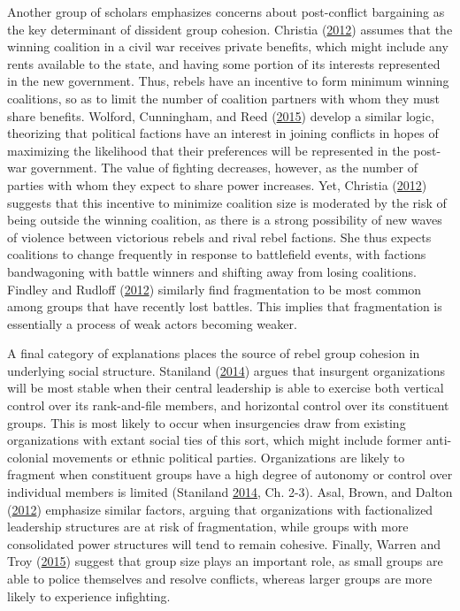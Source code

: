 \documentclass[12pt,]{book}
\theoremstyle{definition}
\theoremstyle{definition}
\theoremstyle{definition}
\theoremstyle{remark}
\begin{document}
Another group of scholars emphasizes concerns about post-conflict
bargaining as the key determinant of dissident group cohesion. Christia
(\protect\hyperlink{ref-Christia2012}{2012}) assumes that the winning
coalition in a civil war receives private benefits, which might include
any rents available to the state, and having some portion of its
interests represented in the new government. Thus, rebels have an
incentive to form minimum winning coalitions, so as to limit the number
of coalition partners with whom they must share benefits. Wolford,
Cunningham, and Reed (\protect\hyperlink{ref-Wolford}{2015}) develop a
similar logic, theorizing that political factions have an interest in
joining conflicts in hopes of maximizing the likelihood that their
preferences will be represented in the post-war government. The value of
fighting decreases, however, as the number of parties with whom they
expect to share power increases. Yet, Christia
(\protect\hyperlink{ref-Christia2012}{2012}) suggests that this
incentive to minimize coalition size is moderated by the risk of being
outside the winning coalition, as there is a strong possibility of new
waves of violence between victorious rebels and rival rebel factions.
She thus expects coalitions to change frequently in response to
battlefield events, with factions bandwagoning with battle winners and
shifting away from losing coalitions. Findley and Rudloff
(\protect\hyperlink{ref-Findley2012}{2012}) similarly find fragmentation
to be most common among groups that have recently lost battles. This
implies that fragmentation is essentially a process of weak actors
becoming weaker.

A final category of explanations places the source of rebel group
cohesion in underlying social structure. Staniland
(\protect\hyperlink{ref-Staniland2014}{2014}) argues that insurgent
organizations will be most stable when their central leadership is able
to exercise both vertical control over its rank-and-file members, and
horizontal control over its constituent groups. This is most likely to
occur when insurgencies draw from existing organizations with extant
social ties of this sort, which might include former anti-colonial
movements or ethnic political parties. Organizations are likely to
fragment when constituent groups have a high degree of autonomy or
control over individual members is limited (Staniland
\protect\hyperlink{ref-Staniland2014}{2014}, Ch. 2-3). Asal, Brown, and
Dalton (\protect\hyperlink{ref-Asal2012}{2012}) emphasize similar
factors, arguing that organizations with factionalized leadership
structures are at risk of fragmentation, while groups with more
consolidated power structures will tend to remain cohesive. Finally,
Warren and Troy (\protect\hyperlink{ref-Warren2015}{2015}) suggest that
group size plays an important role, as small groups are able to police
themselves and resolve conflicts, whereas larger groups are more likely
to experience infighting.
\end{document}
